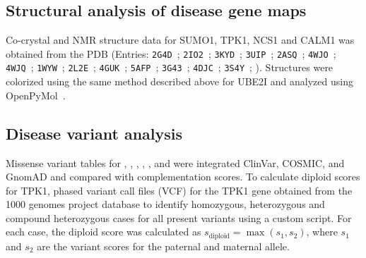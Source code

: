 \subsection{Structural analysis of disease gene maps}
Co-crystal and NMR structure data for SUMO1, TPK1, NCS1 and CALM1 was obtained from the PDB (Entries: \texttt{2G4D}~\cite{xu_crystal_2006}; \texttt{2IO2}~\cite{Reverter http://dx.doi.org/10.1038/nsmb1168}; \texttt{3KYD}~\cite{olsen_active_2010}; \texttt{3UIP}~\cite{gareau_determinants_2012}; \texttt{2ASQ}~\cite{Song http://dx.doi.org/10.1074/jbc.M507059200}; \texttt{4WJO}~\cite{Cappadocia http://dx.doi.org/10.1016/j.str.2014.10.015}; \texttt{4WJQ}~\cite{same as previous}; \texttt{1WYW}~\cite{Baba et al http://dx.doi.org/10.1038/nature03634}; 
\texttt{2L2E}~\cite{Ames etal unpublished}; \texttt{4GUK}~\cite{Chengpeng etal unpublished}; \texttt{5AFP}~\cite{Pandalaneni etal http://dx.doi.org/10.1074/jbc.M114.627059}; 
\texttt{3G43}~\cite{Fallon etal http://www.pnas.org/content/106/13/5135}; \texttt{4DJC}~\cite{sarhan_crystallographic_2012}; 
\texttt{3S4Y}~\cite{timm_crystal_2001}; ). Structures were colorized using the same method described above for UBE2I and analyzed using OpenPyMol~\cite{schrodinger_pymol_2016}.



\subsection{Disease variant analysis}
Missense variant tables for , , , , ,  and  were integrated ClinVar, COSMIC, and GnomAD and compared with complementation scores. To calculate diploid scores for TPK1, phased variant call files (VCF) for the TPK1 gene obtained from the 1000 genomes project database to identify homozygous, heterozygous and compound heterozygous cases for all present variants using a custom script. For each case, the diploid score was calculated as $s_\text{diploid} = \max(s_1,s_2)$, where $s_1$ and $s_2$ are the variant scores for the paternal and maternal allele.